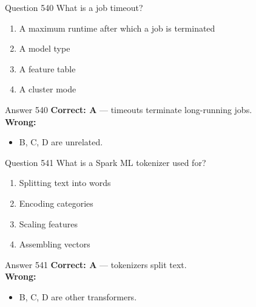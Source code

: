 \documentclass[aspectratio=169,11pt]{beamer}
\begin{document}
	\begin{frame}{Question 540}
		What is a job timeout?
		\begin{enumerate}[label=\Alph*.]
			\item A maximum runtime after which a job is terminated
			\item A model type
			\item A feature table
			\item A cluster mode
		\end{enumerate}
	\end{frame}
	\begin{frame}{Answer 540}
		\textbf{Correct: A} --- timeouts terminate long-running jobs.\\
		\vspace{0.5em}
		\textbf{Wrong:}
		\begin{itemize}
			\item B, C, D are unrelated.
		\end{itemize}
	\end{frame}
	
	\begin{frame}{Question 541}
		What is a Spark ML tokenizer used for?
		\begin{enumerate}[label=\Alph*.]
			\item Splitting text into words
			\item Encoding categories
			\item Scaling features
			\item Assembling vectors
		\end{enumerate}
	\end{frame}
	\begin{frame}{Answer 541}
		\textbf{Correct: A} --- tokenizers split text.\\
		\vspace{0.5em}
		\textbf{Wrong:}
		\begin{itemize}
			\item B, C, D are other transformers.
		\end{itemize}
	\end{frame}
	
\end{document}
